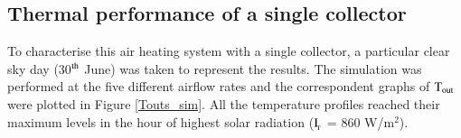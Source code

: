 





%		

\subsection{Thermal performance of a single collector}

To characterise this air heating system with a single collector, a particular clear sky day (30$^{\rm{th}}$ June) was taken to represent the results. The simulation was performed at the five different airflow rates and the correspondent graphs of $\rm{T_{out}}$ were plotted in Figure \ref{Touts_sim}. All the temperature profiles reached their maximum levels in the hour of highest solar radiation ($\rm{I_{\!_T}}$ = 860 W/m$^2$). 


